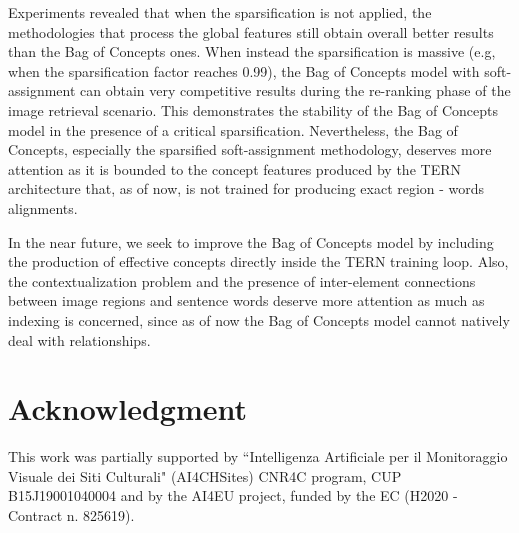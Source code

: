 \documentclass[conference]{IEEEtran}
\begin{document}
Experiments revealed that when the sparsification is not applied, the methodologies that process the global features still obtain overall better results than the Bag of Concepts ones.
When instead the sparsification is massive (e.g, when the sparsification factor reaches 0.99), the Bag of Concepts model with soft-assignment can obtain very competitive results during the re-ranking phase of the image retrieval scenario. This demonstrates the stability of the Bag of Concepts model in the presence of a critical sparsification.
Nevertheless, the Bag of Concepts, especially the sparsified soft-assignment methodology, deserves more attention as it is bounded to the concept features produced by the TERN architecture that, as of now, is not trained for producing exact region - words alignments.


In the near future, we seek to improve the Bag of Concepts model by including the production of effective concepts directly inside the TERN training loop. Also, the contextualization problem and the presence of inter-element connections between image regions and sentence words deserve more attention as much as indexing is concerned, since as of now the Bag of Concepts model cannot natively deal with relationships.

\section*{Acknowledgment}
This work was partially supported by “Intelligenza Artificiale per il Monitoraggio Visuale
dei Siti Culturali" (AI4CHSites) CNR4C program, CUP B15J19001040004 and by the AI4EU project, funded by the EC (H2020 - Contract n. 825619).






\end{document}
